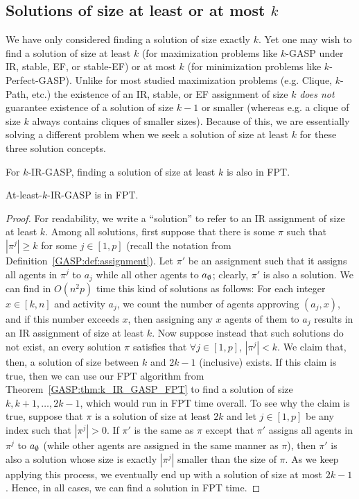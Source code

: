 \subsection{Solutions of size at least or at most $k$}
We have only considered finding a solution of size exactly $k$.
Yet one may wish to find a solution of size at least $k$ (for maximization problems like $k$-GASP under IR, stable, EF, or stable-EF) or at most $k$ (for minimization problems like $k$-Perfect-GASP).
Unlike for most studied maximization problems (e.g. Clique, $k$-Path, etc.) the existence of an IR, stable, or EF assignment of size $k$ {\em does not} guarantee existence of a solution of size $k-1$ or smaller (whereas e.g. a clique of size $k$ always contains cliques of smaller sizes).
Because of this, we are essentially solving a different problem when we seek a solution of size at least $k$ for these three solution concepts. 

For $k$-IR-GASP, finding a solution of size at least $k$ is also in FPT.
\begin{theorem} \label{GASP:thm:k_IR_GASP_FPT_atleast}
At-least-$k$-IR-GASP is in FPT. 
\end{theorem}
\vspace{-1em}\begin{proof}
	For readability, we write a ``solution'' to refer to an IR assignment of size at least $k$.
	Among all solutions, first suppose that there is some $\pi$ such that $|\pi^j| \geq k$ for some $j \in [1,p]$ (recall the notation from Definition~\ref{GASP:def:assignment}). Let $\pi'$ be an assignment such that it assigns all agents in $\pi^j$ to $a_j$ while all other agents to $a_{\emptyset}$; clearly, $\pi'$ is also a solution. We can find in $O(n^2p)$ time this kind of solutions as follows: For each integer $x\in [k, n]$ and activity $a_j$, we count the number of agents approving $(a_j, x)$, and if this number exceeds $x$, then assigning any $x$ agents of them to $a_j$ results in an IR assignment of size at least $k$.
	Now suppose instead that such solutions do not exist, an every solution $\pi$ satisfies that $\forall j\in [1, p]$, $|\pi^j| < k$. We claim that, then, a solution of size between $k$ and $2k-1$ (inclusive) exists. If this claim is true, then we can use our FPT algorithm from Theorem~\ref{GASP:thm:k_IR_GASP_FPT} to find a solution of size $k, k+1, \dots, 2k-1$, which would run in FPT time overall. To see why the claim is true, suppose that $\pi$ is a solution of size at least $2k$ and let $j \in [1,p]$ be any index such that $|\pi^j| > 0$. If $\pi'$ is the same as $\pi$ except that $\pi'$ assigns all agents in $\pi^j$ to $a_{\emptyset}$ (while other agents are assigned in the same manner as $\pi$), then $\pi'$ is also a solution whose size is exactly $|\pi^j|$ smaller than the size of $\pi$. As we keep applying this process, we eventually end up with a solution of size at most $2k-1$. Hence, in all cases, we can find a solution in FPT time. 
\end{proof}\vspace{-.5em}


